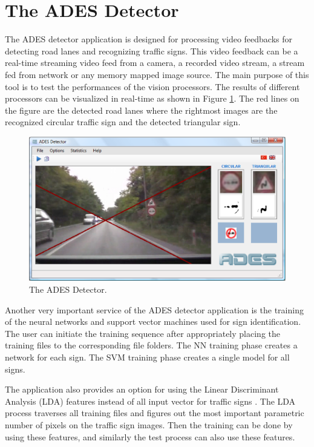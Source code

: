 \documentclass[a4paper,oneside,12pt]{report}
\begin{document}
\section{The ADES Detector}
\label{adesdetector}
The ADES detector application is designed for processing video feedbacks for detecting road lanes and recognizing traffic signs. This video feedback can be a real-time streaming video feed from a camera, a recorded video stream, a stream fed from network or any memory mapped image source. The main purpose of this tool is to test the performances of the vision processors. The results of different processors can be visualized in real-time as shown in Figure \ref{fig:adesdetector}. The red lines on the figure are the detected road lanes where the rightmost images are the recognized circular traffic sign and the detected triangular sign.
\begin{figure}[ht]
\begin{center}
\includegraphics[width=120mm]{img/ADESDetector.eps}
\caption{The ADES Detector.}
\label{fig:adesdetector}
\end{center}
\end{figure}
Another very important service of the ADES detector application is the training of the neural networks and support vector machines used for sign identification. The user can initiate the training sequence after appropriately placing the training files to the corresponding file folders. The NN training phase creates a network for each sign. The SVM training phase creates a single model for all signs.

The application also provides an option for using the Linear Discriminant Analysis (LDA) features instead of all input vector for traffic signs \cite{bochkanov_alglib_2008,mika_fisher_1999}. The LDA process traverses all training files and figures out the most important parametric number of pixels on the traffic sign images. Then the training can be done by using these features, and similarly the test process can also use these features.
\end{document}
